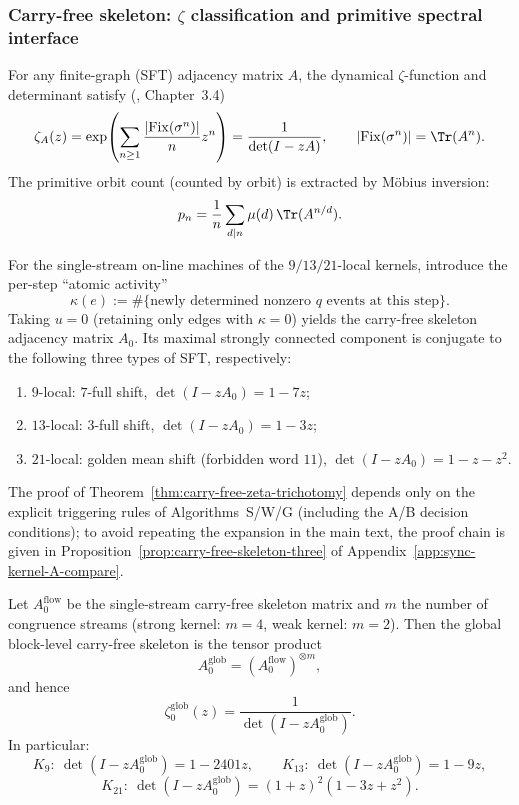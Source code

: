 \subsubsection{Carry-free skeleton: \texorpdfstring{$\zeta$}{zeta} classification and primitive spectral interface}
For any finite-graph (SFT) adjacency matrix $A$, the dynamical $\zeta$-function and determinant satisfy (\cite{BrinStuck2002}, Chapter~3.4)
\[
\zeta_A(z)=\exp\!\left(\sum_{n\ge 1}\frac{|\mathrm{Fix}(\sigma^n)|}{n}z^n\right)=\frac{1}{\det(I-zA)},
\qquad
|\mathrm{Fix}(\sigma^n)|=\Tr(A^n).
\]
The primitive orbit count (counted by orbit) is extracted by M\"obius inversion:
\[
p_n=\frac{1}{n}\sum_{d\mid n}\mu(d)\,\Tr(A^{n/d}).
\]

\begin{theorem}\label{thm:carry-free-zeta-trichotomy}
For the single-stream on-line machines of the $9/13/21$-local kernels, introduce the per-step ``atomic activity''
\[
\kappa(e):=\#\{\text{newly determined nonzero }q\text{ events at this step}\}.
\]
Taking $u=0$ (retaining only edges with $\kappa=0$) yields the carry-free skeleton adjacency matrix $A_0$. Its maximal strongly connected component is conjugate to the following three types of SFT, respectively:
\begin{enumerate}
  \item $9$-local: $7$-full shift, $\det(I-zA_0)=1-7z$;
  \item $13$-local: $3$-full shift, $\det(I-zA_0)=1-3z$;
  \item $21$-local: golden mean shift (forbidden word $11$), $\det(I-zA_0)=1-z-z^2$.
\end{enumerate}
\end{theorem}

\begin{remark}
The proof of Theorem~\ref{thm:carry-free-zeta-trichotomy} depends only on the explicit triggering rules of Algorithms~S/W/G (including the A/B decision conditions); to avoid repeating the expansion in the main text, the proof chain is given in Proposition~\ref{prop:carry-free-skeleton-three} of Appendix~\ref{app:sync-kernel-A-compare}.
\end{remark}

\begin{corollary}\label{cor:global-assembly-zeta}
Let $A_0^{\mathrm{flow}}$ be the single-stream carry-free skeleton matrix and $m$ the number of congruence streams (strong kernel: $m=4$, weak kernel: $m=2$). Then the global block-level carry-free skeleton is the tensor product
\[
A_0^{\mathrm{glob}}=(A_0^{\mathrm{flow}})^{\otimes m},
\]
and hence
\[
\zeta^{\mathrm{glob}}_0(z)=\frac{1}{\det(I-zA_0^{\mathrm{glob}})}.
\]
In particular:
\[
K_9:\ \det(I-zA_0^{\mathrm{glob}})=1-2401z,\qquad
K_{13}:\ \det(I-zA_0^{\mathrm{glob}})=1-9z,
\]
\[
K_{21}:\ \det(I-zA_0^{\mathrm{glob}})=(1+z)^2(1-3z+z^2).
\]
\end{corollary}

